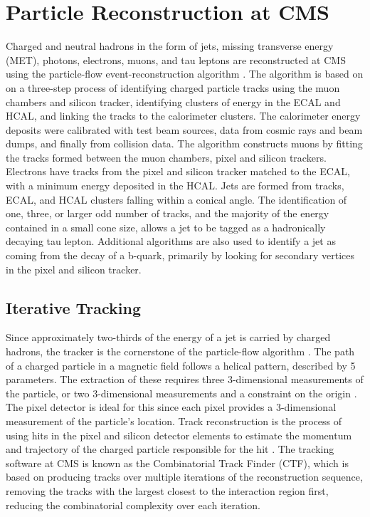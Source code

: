 \chapter{Particle Reconstruction at CMS}
\label{reconstruction_overview}

\par Charged and neutral hadrons in the form of jets, missing
transverse energy (MET), photons, electrons, muons, and tau leptons
are reconstructed at CMS using the particle-flow event-reconstruction
algorithm \cite{CMS-PAS-PFT-09-001}.  The algorithm is based on on a
three-step process of identifying charged particle tracks using the
muon chambers and silicon tracker, identifying clusters of energy in
the ECAL and HCAL, and linking the tracks to the calorimeter
clusters.  The calorimeter energy deposits were calibrated with test
beam sources, data from cosmic rays and beam dumps, and finally from
collision data.  The algorithm constructs muons by fitting the tracks
formed between the muon chambers, pixel and silicon trackers.
Electrons have tracks from the pixel and silicon tracker matched to
the ECAL, with a minimum energy deposited in the HCAL.  Jets are
formed from tracks, ECAL, and HCAL clusters falling within a conical
angle.  The identification of one, three, or larger odd number of
tracks, and the majority of the energy contained in a small cone size,
allows a jet to be tagged as a hadronically decaying tau lepton.
Additional algorithms are also used to identify a jet as coming from
the decay of a b-quark, primarily by looking for secondary vertices in
the pixel and silicon tracker.  


\section{Iterative Tracking}
\label{iterative_tracking_overview}

\par Since approximately two-thirds of the energy of a jet is carried by
charged hadrons, the tracker is the cornerstone of the particle-flow
algorithm \cite{CMS-PAS-PFT-09-001}.  The path of a charged particle in
a magnetic field follows a helical pattern, described by 5 parameters.
The extraction of these requires three 3-dimensional measurements of
the particle, or two 3-dimensional measurements and a constraint on
the origin \cite{Chatrchyan:2014fea}.  The pixel detector is ideal for
this since each pixel provides a 3-dimensional measurement of the
particle's location.  Track reconstruction is the process of using
hits in the pixel and silicon detector elements to estimate the
momentum and trajectory of the charged particle  responsible for the
hit \cite{Chatrchyan:2014fea}.  The tracking software at CMS is known
as the Combinatorial Track Finder (CTF), which is based on producing
tracks over multiple iterations of the reconstruction sequence,
removing the tracks with the largest \PT closest to the interaction
region first, reducing the combinatorial complexity over each
iteration.   

